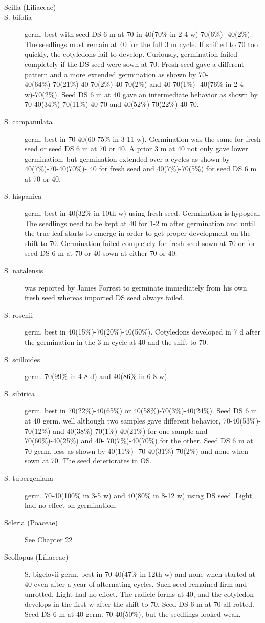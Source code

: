 \begin{description}
\item[Scilla (Liliaceae)]
\item[S. bifolia] germ. best with seed DS 6 m at 70 in 40(70\% in 2-4 w)-70(6\%)-
40(2\%). The seedlings must remain at 40 for the full 3 m cycle. If shifted to 70 too
quickly, the cotyledons fail to develop. Curiously, germination failed completely if the
DS seed were sown at 70. Fresh seed gave a different pattern and a more extended
germination as shown by 70-40(64\%)-70(21\%)-40-70(2\%)-40-70(2\%) and 40-70(1\%)-
40(76\% in 2-4 w)-70(2\%). Seed DS 6 m at 40 gave an intermediate behavior as
shown by 70-40(34\%)-70(11\%)-40-70 and 40(52\%)-70(22\%)-40-70.
\item[S. campanulata] germ. best in 70-40(60-75\% in 3-11 w). Germination was the
same for fresh seed or seed DS 6 m at 70 or 40. A prior 3 m at 40 not only gave lower
germination, but germination extended over a cycles as shown by 40(7\%)-70-40(70\%)-
40 for fresh seed and 40(7\%)-70(5\%) for seed DS 6 m at 70 or 40.
\item[S. hispanica] germ. best in 40(32\% in 10th w) using fresh seed. Germination is
hypogeal. The seedlings need to be kept at 40 for 1-2 m after germination and until
the true leaf starts to emerge in order to get proper development on the shift to 70.
Germination failed completely for fresh seed sown at 70 or for seed DS 6 m at 70 or 40
sown at either 70 or 40.
\item[S. natalensis] was reported by James Forrest to germinate immediately from his
own fresh seed whereas imported DS seed always failed.
\item[S. rosenii] germ. best in 40(15\%)-70(20\%)-40(50\%). Cotyledons developed in 7
d after the germination in the 3 m cycle at 40 and the shift to 70.
\item[S. scilloides] germ. 70(99\% in 4-8 d) and 40(86\% in 6-8 w).
\item[S. sibirica] germ. best in 70(22\%)-40(65\%) or 40(58\%)-70(3\%)-40(24\%). Seed
DS 6 m at 40 germ. well although two samples gave different behavior, 70-40(53\%)-
70(12\%) and 40(38\%)-70(1\%)-40(21\%) for one sample and 70(60\%)-40(25\%) and 40-
70(7\%)-40(70\%) for the other. Seed DS 6 m at 70 germ. less as shown by 40(11\%)-
70-40(31\%)-70(2\%) and none when sown at 70. The seed deteriorates in OS.
\item[S. tubergeniana] germ. 70-40(100\% in 3-5 w) and 40(80\% in 8-12 w) using DS
seed. Light had no effect on germination.

\item[Scleria (Poaceae)] See Chapter 22
\item[Scollopus (Liliaceae)] S. bigelovii germ. best in 70-40(47\% in 12th w) and
none when started at 40 even after a year of alternating cycles. Such seed remained
firm and unrotted. Light had no effect. The radicle forms at 40, and the cotyledon
develops in the first w after the shift to 70. Seed DS 6 m at 70 all rotted. Seed DS 6 m
at 40 germ. 70-40(50\%), but the seedlings looked weak.


\end{description}
